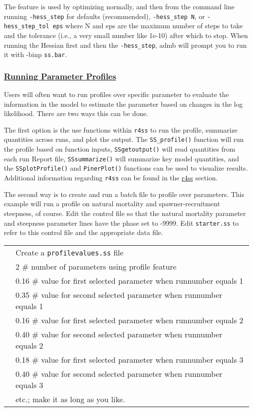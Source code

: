 The feature is used by optimizing normally, and then from the command line running \texttt{-hess\_step} for defaults (recommended), \texttt{-hess\_step N}, or \texttt{-hess\_step\_tol eps} where N and eps are the maximum number of steps to take and the tolerance (i.e., a very small number like 1e-10) after which to stop. When running the Hessian first and then the \texttt{-hess\_step}, \gls{admb} will prompt you to run it with -binp \texttt{ss.bar}.

\hypertarget{ParamProfiles}{}
\subsubsection[Running Parameter Profiles]{\protect\hyperlink{ParamProfiles}{Running Parameter Profiles}}
Users will often want to run profiles over specific parameter to evaluate the information in the model to estimate the parameter based on changes in the log likelihood. There are two ways this can be done.

The first option is the use functions within \texttt{r4ss} to run the profile, summarize quantities across runs, and plot the output. The \texttt{SS\_profile()} function will run the profile based on function inputs, \texttt{SSgetoutput()} will read quantities from each run Report file, \texttt{SSsummarize()} will summarize key model quantities, and the \texttt{SSplotProfile()} and \texttt{PinerPlot()} functions can be used to visualize results. Additional information regarding \texttt{r4ss} can be found in the \hyperref[sec:r4ss]{r4ss} section. 

The second way is to create and run a batch file to profile over parameters. This example will run a profile on natural mortality and spawner-recruitment steepness, of course. Edit the control file so that the natural mortality parameter and steepness parameter lines have the phase set to -9999. Edit \texttt{starter.ss} to refer to this control file and the appropriate data file.

	\begin{longtable}{p{0.5cm} p{16cm}}		
		& Create a \texttt{profilevalues.ss} file \\
		& 2	\# number of parameters using profile feature \\
		& 0.16	\# value for first selected parameter when runnumber equals 1 \\
		& 0.35	\# value for second selected parameter when runnumber equals 1 \\
		& 0.16	\# value for first selected parameter when runnumber equals 2 \\
		& 0.40	\# value for second selected parameter when runnumber equals 2 \\
		& 0.18	\# value for first selected parameter when runnumber equals 3 \\
		& 0.40	\# value for second selected parameter when runnumber equals 3 \\
		& etc.;  make it as long as you like. \\
	\end{longtable}

